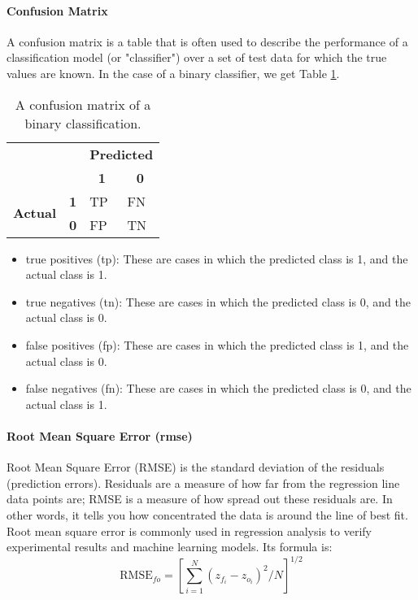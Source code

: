 \paragraph{Confusion Matrix}
A confusion matrix is a table that is often used to describe the performance of a classification model (or "classifier") over a set of test data for which the true values are known. In the case of a binary classifier, we get Table \ref{confusion_matrix_eg}.
\begin{table}[h]
\centering
\begin{tabular}{ll|l|l|}
\cline{3-4}
                                                       &                                 & \multicolumn{2}{c|}{\textbf{Predicted}}                           \\ \cline{3-4} 
                                                       &                                 & \multicolumn{1}{c|}{\textbf{1}} & \multicolumn{1}{c|}{\textbf{0}} \\ \hline
\multicolumn{1}{|c|}{\multirow{2}{*}{\textbf{Actual}}} & \multicolumn{1}{c|}{\textbf{1}} & TP                              & FN                              \\ \cline{2-4} 
\multicolumn{1}{|c|}{}                                 & \multicolumn{1}{c|}{\textbf{0}} & FP                              & TN                              \\ \hline
\end{tabular}
\caption{A confusion matrix of a binary classification.}
\label{confusion_matrix_eg}
\end{table}
\begin{itemize}  
\item true positives (\acs{tp}): These are cases in which the predicted class is 1, and the actual class is 1.
\item true negatives (\acs{tn}): These are cases in which the predicted class is 0, and the actual class is 0.
\item false positives (\acs{fp}): These are cases in which the predicted class is 1, and the actual class is 0.
\item false negatives (\acs{fn}): These are cases in which the predicted class is 0, and the actual class is 1.
\end{itemize}
\paragraph{Root Mean Square Error (\acs{rmse})}
Root Mean Square Error (RMSE) is the standard deviation of the residuals (prediction errors). Residuals are a measure of how far from the regression line data points are; RMSE is a measure of how spread out these residuals are. In other words, it tells you how concentrated the data is around the line of best fit. Root mean square error is commonly used in regression analysis to verify experimental results and machine learning models. Its formula is:
\begin{equation}
 \mathrm { RMSE } _ { f o } = \left[ \sum _ { i = 1 } ^ { N } \left( z _ { f _ { i } } - z _ { o _ { i } } \right) ^ { 2 } / N \right] ^ { 1 / 2 }
 \label{RMSE_formula}
\end{equation}

